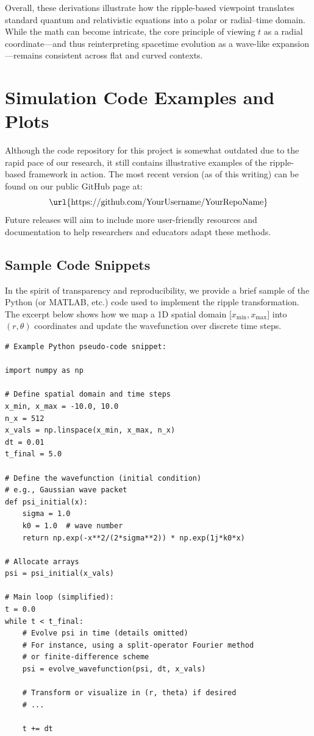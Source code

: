 \documentclass{article}
\begin{document}
\bigskip

\noindent
Overall, these derivations illustrate how the ripple-based viewpoint 
translates standard quantum and relativistic equations into a polar 
or radial--time domain. While the math can become intricate, the core 
principle of viewing $t$ as a radial coordinate---and thus reinterpreting 
spacetime evolution as a wave-like expansion---remains consistent across 
flat and curved contexts.


\section{Simulation Code Examples and Plots}
\label{app:sim-code}

Although the code repository for this project is somewhat outdated due 
to the rapid pace of our research, it still contains illustrative examples 
of the ripple-based framework in action. The most recent version (as of 
this writing) can be found on our public GitHub page at:
\[
  \text{\url{https://github.com/YourUsername/YourRepoName}}
\]
Future releases will aim to include more user-friendly resources and 
documentation to help researchers and educators adapt these methods.

\subsection{Sample Code Snippets}
\label{app:subsec:code-snippets}
In the spirit of transparency and reproducibility, we provide a brief 
sample of the Python (or MATLAB, etc.) code used to implement the 
ripple transformation. The excerpt below shows how we map a 
1D spatial domain \(\bigl[x_{\min}, x_{\max}\bigr]\) into \((r, \theta)\) 
coordinates and update the wavefunction over discrete time steps.

\begin{verbatim}
# Example Python pseudo-code snippet:

import numpy as np

# Define spatial domain and time steps
x_min, x_max = -10.0, 10.0
n_x = 512
x_vals = np.linspace(x_min, x_max, n_x)
dt = 0.01
t_final = 5.0

# Define the wavefunction (initial condition) 
# e.g., Gaussian wave packet
def psi_initial(x):
    sigma = 1.0
    k0 = 1.0  # wave number
    return np.exp(-x**2/(2*sigma**2)) * np.exp(1j*k0*x)

# Allocate arrays
psi = psi_initial(x_vals)

# Main loop (simplified):
t = 0.0
while t < t_final:
    # Evolve psi in time (details omitted)
    # For instance, using a split-operator Fourier method
    # or finite-difference scheme
    psi = evolve_wavefunction(psi, dt, x_vals)

    # Transform or visualize in (r, theta) if desired
    # ...
    
    t += dt
\end{verbatim}
\end{document}
